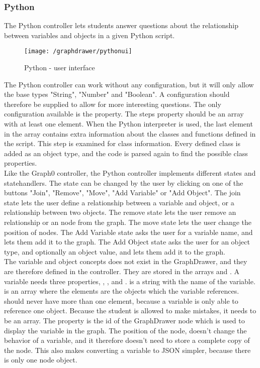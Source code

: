 \subsubsection{Python}
The Python controller lets students answer questions about the relationship between variables and objects in a given Python script.
\begin{figure}[H]
    \centering
    \texttt{[image: /graphdrawer/pythonui]}
    \caption{Python - user interface}
    \label{fig:graphdrawerPythonUserInterface}
\end{figure}
\noindent
The Python controller can work without any configuration, but it will only allow the base types "String", "Number" and "Boolean". A configuration should therefore be supplied to allow for more interesting questions. The only configuration available is the  property. The steps property should be an array with at least one element. When the Python interpreter is used, the last element in the array contains extra information about the classes and functions defined in the script. This step is examined for class information. Every defined class is added as an object type, and the code is parsed again to find the possible class properties.
\\[11pt]
Like the Graph0 controller, the Python controller implements different states and statehandlers. The state can be changed by the user by clicking on one of the buttons "Join", "Remove", "Move", "Add Variable" or "Add Object". The join state lets the user define a relationship between a variable and object, or a relationship between two objects. The remove state lets the user remove an relationship or an node from the graph. The move state lets the user change the position of nodes. The Add Variable state asks the user for a variable name, and lets them add it to the graph. The Add Object state asks the user for an object type, and optionally an object value, and lets them add it to the graph.
\\[11pt]
The variable and object concepts does not exist in the GraphDrawer, and they are therefore defined in the controller. They are stored in the arrays  and . A variable needs three properties, , , and .  is a string with the name of the variable.  is an array where the elements are the objects which the variable references.  should never have more than one element, because a variable is only able to reference one object. Because the student is allowed to make mistakes, it needs to be an array. The  property is the id of the GraphDrawer node which is used to display the variable in the graph. The position of the node, doesn't change the behavior of a variable, and it therefore doesn't need to store a complete copy of the node. This also makes converting a variable to JSON simpler, because there is only one node object.
